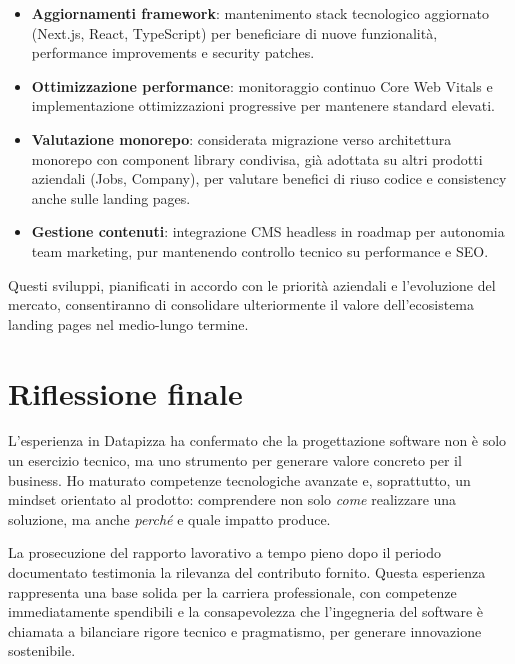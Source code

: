 \begin{itemize}
  \item \textbf{Aggiornamenti framework}: mantenimento stack tecnologico 
        aggiornato (Next.js, React, TypeScript) per beneficiare di nuove 
        funzionalità, performance improvements e security patches.
  
  \item \textbf{Ottimizzazione performance}: monitoraggio continuo Core Web Vitals 
        e implementazione ottimizzazioni progressive per mantenere standard elevati.
  
  \item \textbf{Valutazione monorepo}: considerata migrazione verso architettura 
        monorepo con component library condivisa, già adottata su altri prodotti 
        aziendali (Jobs, Company), per valutare benefici di riuso codice e 
        consistency anche sulle landing pages.
  
  \item \textbf{Gestione contenuti}: integrazione CMS headless in roadmap per 
        autonomia team marketing, pur mantenendo controllo tecnico su 
        performance e SEO.
\end{itemize}

Questi sviluppi, pianificati in accordo con le priorità aziendali e l'evoluzione 
del mercato, consentiranno di consolidare ulteriormente il valore dell'ecosistema 
landing pages nel medio-lungo termine.

\section{Riflessione finale}
L'esperienza in Datapizza ha confermato che la progettazione software non è solo
un esercizio tecnico, ma uno strumento per generare valore concreto per il business.
Ho maturato competenze tecnologiche avanzate e, soprattutto, un mindset orientato al prodotto:
comprendere non solo \textit{come} realizzare una soluzione, ma anche \textit{perché}
e quale impatto produce.

La prosecuzione del rapporto lavorativo a tempo pieno dopo il periodo documentato
testimonia la rilevanza del contributo fornito. Questa esperienza rappresenta una base solida
per la carriera professionale, con competenze immediatamente spendibili e la consapevolezza
che l'ingegneria del software è chiamata a bilanciare rigore tecnico e pragmatismo,
per generare innovazione sostenibile.
